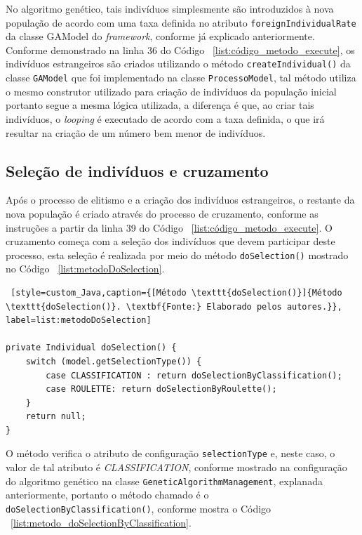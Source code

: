 \par No algoritmo genético, tais indivíduos simplesmente são introduzidos à nova população de acordo com uma taxa definida no 
atributo \texttt{foreignIndividualRate} da classe GAModel do \textit{framework}, conforme já explicado anteriormente. Conforme 
demonstrado na linha 36 do Código ~\ref{list:código_metodo_execute}, os indivíduos estrangeiros são criados utilizando o método \texttt{createIndividual()} da classe \texttt{GAModel} que foi implementado na classe \texttt{ProcessoModel}, 
tal método utiliza o mesmo construtor utilizado para criação de indivíduos da população inicial portanto segue a mesma lógica utilizada, a diferença é que, ao criar tais indivíduos, o \textit{looping} é executado de acordo com a taxa definida, o que irá resultar na criação de um número bem menor de indivíduos.

\subsection{Seleção de indivíduos e cruzamento} 

\par Após o processo de elitismo e a criação dos indivíduos estrangeiros, o restante da nova população é criado através do processo
de cruzamento, conforme as instruções a partir da linha 39 do Código ~\ref{list:código_metodo_execute}. O cruzamento começa com a 
seleção dos indivíduos que devem participar deste processo, esta seleção é realizada por meio do método \texttt{doSelection()} 
mostrado no Código ~\ref{list:metodoDoSelection}.

\begin{lstlisting} [style=custom_Java,caption={[Método \texttt{doSelection()}]{Método \texttt{doSelection()}. \textbf{Fonte:} Elaborado pelos autores.}}, label=list:metodoDoSelection] 

private Individual doSelection() {
	switch (model.getSelectionType()) {
		case CLASSIFICATION : return doSelectionByClassification();
		case ROULETTE: return doSelectionByRoulette();
	}
	return null;
}

\end{lstlisting}

\par O método verifica o atributo de configuração \texttt{selectionType} e, neste caso, o valor de tal atributo é 
\textit{CLASSIFICATION}, conforme mostrado na configuração do algoritmo genético na classe \texttt{GeneticAlgorithmManagement}, 
explanada anteriormente, portanto o método chamado é o \texttt{doSelectionByClassification()}, conforme mostra o Código
~\ref{list:metodo_doSelectionByClassification}.

